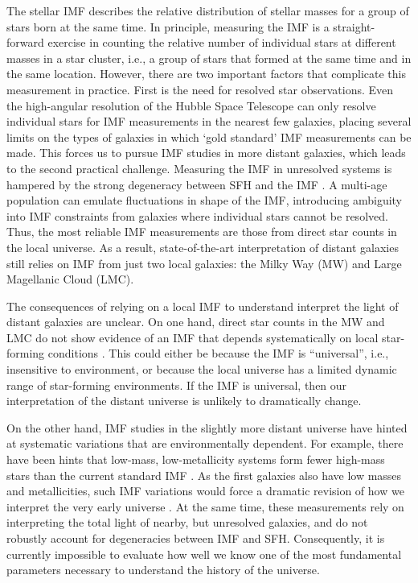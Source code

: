 \documentclass[11pt,preprint]{aastex}
\begin{document}
The stellar IMF describes the relative distribution of stellar masses for a group of stars born at the same time.  In principle, measuring the IMF is a straight-forward exercise in counting the relative number of individual stars at different masses in a star cluster, i.e., a group of stars that formed at the same time and in the same location.  However, there are two important factors that complicate this measurement in practice.  First is the need for resolved star observations. Even the high-angular resolution of the Hubble Space Telescope can only resolve individual stars for IMF measurements in the nearest few galaxies, placing several limits on the types of galaxies in which `gold standard' IMF measurements can be made.  This forces us to pursue IMF studies in more distant galaxies, which leads to the second practical challenge.  Measuring the IMF in unresolved systems is hampered by the strong degeneracy between SFH and the IMF \citep{miller1979, elmegreen2006}.  A multi-age population can emulate fluctuations in shape of the IMF, introducing ambiguity into IMF constraints from galaxies where individual stars cannot be resolved.   Thus, the most reliable IMF measurements are those from direct star counts in the local universe.  As a result, state-of-the-art interpretation of distant galaxies still  relies on IMF from just two local galaxies: the Milky Way (MW) and Large Magellanic Cloud (LMC).  

The consequences of relying on a local IMF to understand interpret the light of distant galaxies are unclear.  On one hand, direct star counts in the MW and LMC do not show evidence of an IMF that depends systematically on local star-forming conditions \citep[e.g., gas density, metallicity, star formation intensity]{bastian2010}. This could either be because the IMF is ``universal'', i.e., insensitive to environment, or because the local universe has a limited dynamic range of star-forming environments.  If the IMF is universal, then our interpretation of the distant universe is unlikely to dramatically change.  

On the other hand, IMF studies in the slightly more distant universe have hinted at systematic variations that are environmentally dependent.  For example, there have been hints that low-mass, low-metallicity systems form fewer high-mass stars than the current standard IMF \citep[e.g.,][]{lee2009, meurer2009}.  As the first galaxies also have low masses and metallicities, such IMF variations would force a dramatic revision of how we interpret the very early universe \citep[e.g.,][]{pflammAltenburg2009}.  At the same time, these measurements rely on interpreting the total light of nearby, but unresolved galaxies, and do not robustly account for degeneracies between IMF and SFH.  Consequently, it is currently impossible to evaluate how well we know one of the most fundamental parameters necessary to understand the history of the universe. 
\end{document}
